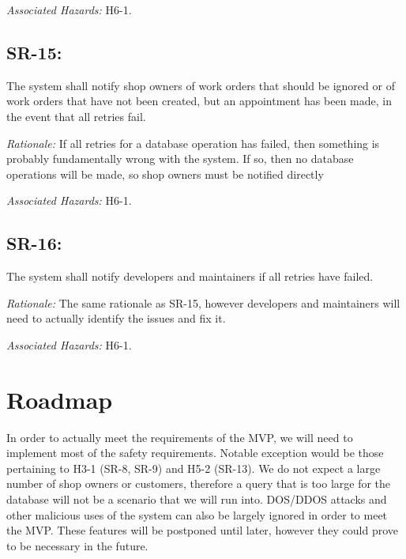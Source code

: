\documentclass{article}
\begin{document}
\emph{Associated Hazards: }H6-1.

\subsection*{SR-15:}
The system shall notify shop owners of work orders that should be ignored or of work orders that have not been created, but an appointment has been made, in the event that all retries fail.

\emph{Rationale: }If all retries for a database operation has failed, then something is probably fundamentally wrong with the system. If so, then no database operations will be made, so shop owners must be notified directly

\emph{Associated Hazards: }H6-1.

\subsection*{SR-16:}
The system shall notify developers and maintainers if all retries have failed.

\emph{Rationale: }The same rationale as SR-15, however developers and maintainers will need to actually identify the issues and fix it.

\emph{Associated Hazards: }H6-1.

\section{Roadmap}

In order to actually meet the requirements of the MVP, we will need to implement most of the safety requirements. Notable exception would be those pertaining to H3-1 (SR-8, SR-9) and H5-2 (SR-13). We do not expect a large number of shop owners or customers, therefore a query that is too large for the database will not be a scenario that we will run into. DOS/DDOS attacks and other malicious uses of the system can also be largely ignored in order to meet the MVP. These features will be postponed until later, however they could prove to be necessary in the future.
\end{document}
